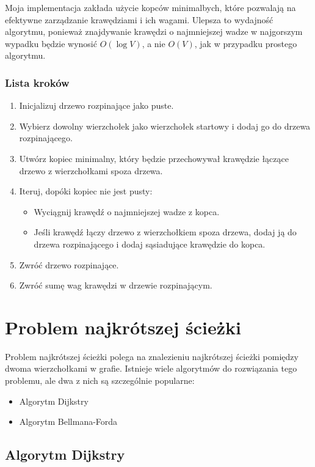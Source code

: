 \documentclass{article}
\begin{document}
Moja implementacja zakłada użycie kopców minimalbych, które pozwalają na efektywne zarządzanie krawędziami i ich wagami. Ulepsza to wydajność algorytmu,
ponieważ znajdywanie krawędzi o najmniejszej wadze w najgorszym wypadku będzie wynosić $O(\log V)$, a nie $O(V)$, jak w przypadku prostego algorytmu.

\subsubsection{Lista kroków}
\begin{enumerate}
    \item Inicjalizuj drzewo rozpinające jako puste.
    \item Wybierz dowolny wierzchołek jako wierzchołek startowy i dodaj go do drzewa rozpinającego.
    \item Utwórz kopiec minimalny, który będzie przechowywał krawędzie łączące drzewo z wierzchołkami spoza drzewa.
    \item Iteruj, dopóki kopiec nie jest pusty:
    \begin{itemize}
        \item Wyciągnij krawędź o najmniejszej wadze z kopca.
        \item Jeśli krawędź łączy drzewo z wierzchołkiem spoza drzewa, dodaj ją do drzewa rozpinającego i dodaj sąsiadujące krawędzie do kopca.
    \end{itemize}
    \item Zwróć drzewo rozpinające.
    \item Zwróć sumę wag krawędzi w drzewie rozpinającym.
\end{enumerate}

\section{Problem najkrótszej ścieżki}

Problem najkrótszej ścieżki polega na znalezieniu najkrótszej ścieżki pomiędzy dwoma wierzchołkami w grafie. Istnieje wiele algorytmów do rozwiązania tego problemu, ale dwa z nich są szczególnie popularne:
\begin{itemize}
    \item Algorytm Dijkstry
    \item Algorytm Bellmana-Forda
\end{itemize}

\subsection{Algorytm Dijkstry}
\end{document}
